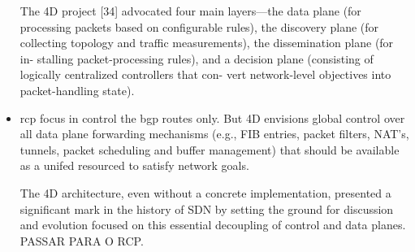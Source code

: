 \begin{itemize}
The 4D project [34] advocated four main layers—the data plane (for processing packets based on configurable rules), the discovery plane (for collecting topology and traffic measurements), the dissemination plane (for in- stalling packet-processing rules), and a decision plane (consisting of logically centralized controllers that con- vert network-level objectives into packet-handling state). 

\item\gls{rcp} focus in control the \gls{bgp} routes only. But 4D envisions global control over all data plane forwarding mechanisms (e.g., FIB entries, packet filters, NAT's, tunnels, packet scheduling and buffer management) that should be available as a unifed  resourced to satisfy network goals. 



The 4D architecture, even without a concrete implementation,   presented a significant mark in the history of SDN by setting the  ground for discussion and evolution focused on this essential  decoupling of control and data planes.  PASSAR PARA O RCP. 






\end{itemize}
